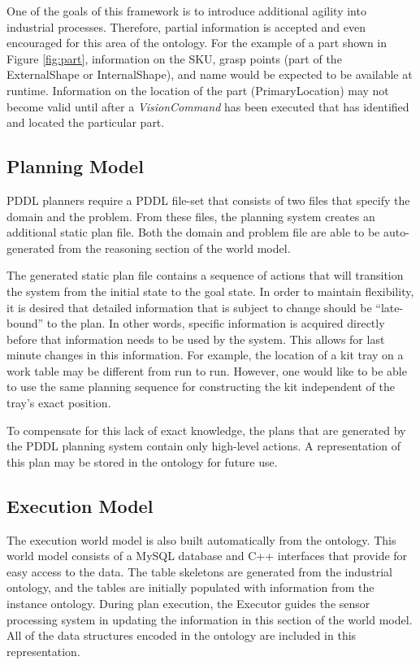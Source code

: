 One of the goals of this framework is to introduce additional agility into industrial processes. Therefore,
partial information is accepted and even encouraged for this area of the ontology. For the example of a part shown in Figure \ref{fig:part}, information on the SKU, grasp points 
(part of the ExternalShape or InternalShape), and name would be expected to be available at runtime. Information on the location of the part (PrimaryLocation) may not
become valid until after a \textit{VisionCommand} has been executed
that has identified and located the particular part.
%
\subsection{Planning Model}
PDDL planners require a PDDL file-set that consists of two files that specify the domain and the problem.
From these files, the planning system creates an additional static plan file. Both the domain and problem file are able to be auto-generated from the reasoning section of the world model.

The generated static plan file contains a sequence of actions that will transition the system from the initial state to the goal state. In order to maintain flexibility, it is desired that detailed information that is subject to change should be ``late-bound'' to the plan. In other words, specific information is acquired directly before that information needs to be used by the system. This allows for last minute changes in this information. For example, the location of a kit tray on a work table may be different from run to run. However, one would like to be able to use the same planning sequence for constructing the kit independent of the tray's exact position.

To compensate for this lack of exact knowledge, the plans that are generated by the PDDL planning system contain only high-level actions. A representation of this plan may be stored in the ontology for future use.
% 
\subsection{Execution Model}
The execution world model is also built automatically from the
ontology. This world model consists of a MySQL database and C++ 
interfaces
that provide for easy access to the data. The table skeletons are 
generated from
the industrial ontology, and the tables are initially populated with 
information
from the instance ontology. During plan execution, the Executor 
guides the
sensor processing system in updating the information in this section 
of the world
model. All of the data structures encoded in the ontology are 
included in this
representation.
%
